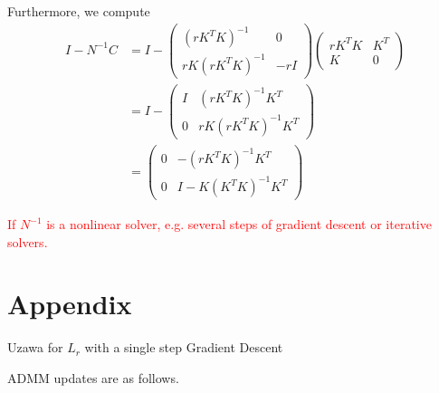 \begin{itemize}
Furthermore, we compute 
\begin{equation}
\begin{aligned}
      I - N^{-1} C & = I - \begin{pmatrix}
     (r K^T K)^{-1} &  0 \\
    r K (r K^T K)^{-1} & -r I
    \end{pmatrix} \begin{pmatrix}
    r K^TK & K^T \\
    K & 0
    \end{pmatrix} \\
    & = I - \begin{pmatrix}
    I &   (r K^T K)^{-1} K^T\\
     0 &  rK(rK^TK)^{-1}K^T 
    \end{pmatrix}\\
    & = \begin{pmatrix}
    0 & - (r K^T K)^{-1} K^T\\
    0 & I - K(K^TK)^{-1}K^T
    \end{pmatrix}
\end{aligned}
\end{equation}



\textcolor{red}{If $N^{-1}$ is a nonlinear solver, e.g. several steps of gradient descent or iterative solvers. 
}
 
\section{Appendix} 



 
\begin{algorithm}\label{alginexact4} \caption{Uzawa for $L_r$ with a single step Gradient Descent}
ADMM updates are as follows. 
\begin{algorithmic}
\EndFor
\end{algorithmic}
\end{algorithm}


\end{itemize}
